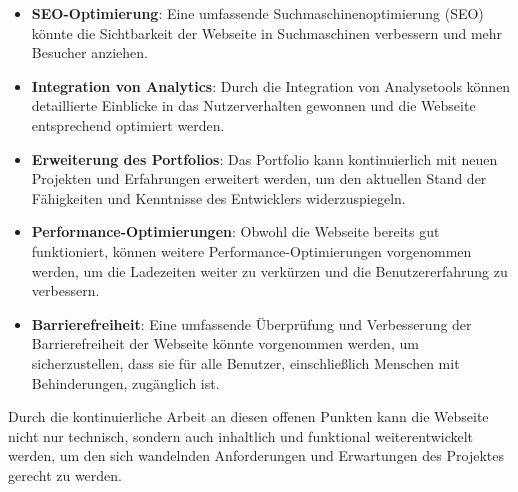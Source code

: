 \begin{itemize}
    \item \textbf{SEO-Optimierung}: Eine umfassende Suchmaschinenoptimierung (SEO) könnte die Sichtbarkeit der Webseite in Suchmaschinen verbessern und mehr Besucher anziehen.

    \item \textbf{Integration von Analytics}: Durch die Integration von Analysetools können detaillierte Einblicke in das Nutzerverhalten gewonnen und die Webseite entsprechend optimiert werden.
    
    \item \textbf{Erweiterung des Portfolios}: Das Portfolio kann kontinuierlich mit neuen Projekten und Erfahrungen erweitert werden, um den aktuellen Stand der Fähigkeiten und Kenntnisse des Entwicklers widerzuspiegeln.
    
    \item \textbf{Performance-Optimierungen}: Obwohl die Webseite bereits gut funktioniert, können weitere Performance-Optimierungen vorgenommen werden, um die Ladezeiten weiter zu verkürzen und die Benutzererfahrung zu verbessern.
    
    \item \textbf{Barrierefreiheit}: Eine umfassende Überprüfung und Verbesserung der Barrierefreiheit der Webseite könnte vorgenommen werden, um sicherzustellen, dass sie für alle Benutzer, einschließlich Menschen mit Behinderungen, zugänglich ist.
    
\end{itemize}
Durch die kontinuierliche Arbeit an diesen offenen Punkten kann die Webseite nicht nur technisch, sondern auch inhaltlich und funktional weiterentwickelt werden, um den sich wandelnden Anforderungen und Erwartungen des Projektes gerecht zu werden.